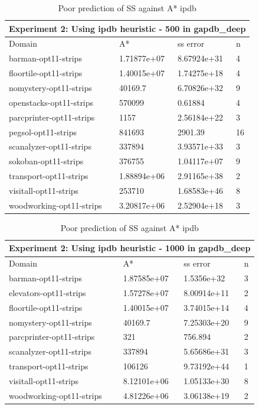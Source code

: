 \documentclass[a4paper,12pt]{article}
\begin{document}
\begin{table}[htb]
\centering
\caption{Poor prediction of SS against A* ipdb}
\label{my-label}
\begin{tabular}{l|l|l|l}
\hline
\multicolumn{4}{l}{Experiment 2: Using ipdb heuristic - 500 in gapdb\_deep} \\ \hline
Domain& A*& ss error& n \\ \hline
barman-opt11-strips& 1.71877e+07& 8.67924e+31& 4\\ \hline
floortile-opt11-strips& 1.40015e+07& 1.74275e+18& 4\\ \hline
nomystery-opt11-strips& 40169.7& 6.70826e+32& 9\\ \hline
openstacks-opt11-strips& 570099& 0.61884& 4\\ \hline
parcprinter-opt11-strips& 1157& 2.56184e+22& 3\\ \hline
pegsol-opt11-strips& 841693& 2901.39& 16\\ \hline
scanalyzer-opt11-strips& 337894& 3.93571e+33& 3\\ \hline
sokoban-opt11-strips& 376755& 1.04117e+07& 9\\ \hline
transport-opt11-strips& 1.88894e+06& 2.91165e+38& 2\\ \hline
visitall-opt11-strips& 253710& 1.68583e+46& 8\\ \hline
woodworking-opt11-strips& 3.20817e+06& 2.52904e+18& 3\\ \hline
\end{tabular}
\end{table}


\begin{table}[htb]
\centering
\caption{Poor prediction of SS against A* ipdb}
\label{my-label}
\begin{tabular}{l|l|l|l}
\hline
\multicolumn{4}{l}{Experiment 2: Using ipdb heuristic - 1000 in gapdb\_deep} \\ \hline
Domain& A*& ss error& n \\ \hline
barman-opt11-strips& 1.87585e+07& 1.5356e+32& 3\\ \hline
elevators-opt11-strips& 1.57278e+07& 8.00914e+11& 2\\ \hline
floortile-opt11-strips& 1.40015e+07& 3.74015e+14& 4\\ \hline
nomystery-opt11-strips& 40169.7& 7.25303e+20& 9\\ \hline
parcprinter-opt11-strips& 321& 756.894& 2\\ \hline
scanalyzer-opt11-strips& 337894& 5.65686e+31& 3\\ \hline
transport-opt11-strips& 106126& 9.73192e+44& 1\\ \hline
visitall-opt11-strips& 8.12101e+06& 1.05133e+30& 8\\ \hline
woodworking-opt11-strips& 4.81226e+06& 3.06138e+19& 2\\ \hline
\end{tabular}
\end{table}
\end{document}
